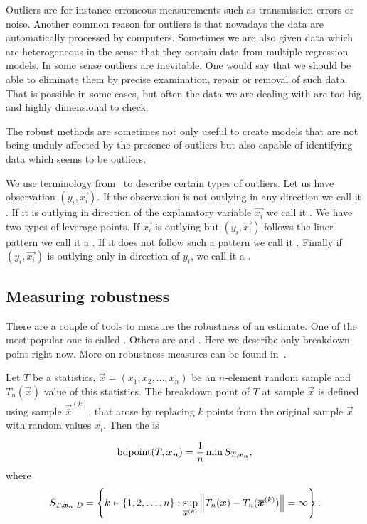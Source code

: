 Outliers are for instance erroneous measurements such as transmission errors or noise. Another common reason for outliers is that nowadays the data are automatically processed by computers. Sometimes we are also given data which are heterogeneous in the sense that they contain data from multiple regression models. In some sense outliers are inevitable. One would say that we should be able to eliminate them by precise examination, repair or removal of such data. That is possible in some cases, but often the data we are dealing with are too big and highly dimensional to check.

The robust methods are sometimes not only useful to create models that are not being unduly affected by the presence of outliers but also capable of identifying data which seems to be outliers. 

We use terminology from~\cite{rouss:1990} to describe certain types of outliers. Let us have observation $(y_i, \vec{x_i})$. If the observation is not outlying in any direction we call it  . If it is outlying in direction of the explanatory variable $\vec{x_i}$  we call it . We have two types of leverage points. If $\vec{x_i}$ is outlying but $(y_i, \vec{x_i})$ follows the liner pattern we call it a . If it does not follow such a pattern we call it . Finally if $(y_i, \vec{x_i})$ is  outlying only in direction of $y_i$, we call it a .

\subsection{Measuring robustness}
There are a couple of tools to measure the robustness of an estimate. One of the most popular one is called . Others are  and .  Here we describe only breakdown point right now. More on robustness measures can be found in~\cite{hampel1986robust}.

\begin{definition}
    Let $T$ be a statistics, $\vec{x} = (x_1, x_2,\ldots,x_n)$ be an $n$-element random sample and $T_n(\vec{x})$ value of this statistics. The breakdown point of $T$ at sample $\vec{x}$ is defined using sample $\vec{\overline{x}}^{(k)}$, that arose by replacing $k$ points from the original sample $\vec{x}$ with random values $x_i$. Then the  is 

\begin{equation}
    \operatorname{bdpoint}(T,\boldsymbol{x_n} ) = \frac{1}{n} \min S_{T, \boldsymbol{x_n}} , 
\end{equation}
where 
\begin{equation}
   S_{T, \boldsymbol{x_n}, D} = 
  \left\{ k \in \{{1,2, \ldots ,n\}} : \sup_{ \boldsymbol{\overline{x}}^{(k)} } \left\lVert T_n(\boldsymbol{x}) - T_n(\boldsymbol{\overline{x}}^{(k)})\right\rVert = \infty   \right\}.  
\end{equation}
\end{definition}

